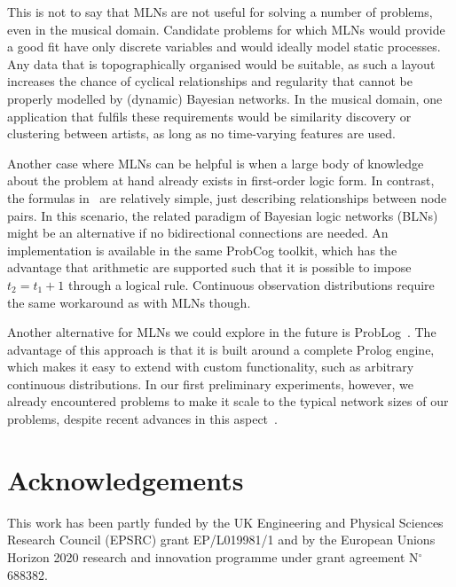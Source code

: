 \documentclass[letterpaper]{article} %
\begin{document}
This is not to say that MLNs are not useful for solving a number of problems, even in the musical domain. Candidate problems for which MLNs would provide a good fit have only discrete variables and would ideally model static processes. Any data that is topographically organised would be suitable, as such a layout increases the chance of cyclical relationships and regularity that cannot be properly modelled by (dynamic) Bayesian networks. In the musical domain, one application that fulfils these requirements would be similarity discovery or clustering between artists, as long as no time-varying features are used.

Another case where MLNs can be helpful is when a large body of knowledge about the problem at hand already exists in first-order logic form. In contrast, the formulas in~\cite{papadopoulos2012ismir,papadopoulos2013icassp,papadopoulos2017taslp} are relatively simple, just describing relationships between node pairs. In this scenario, the related paradigm of Bayesian logic networks (BLNs)~\cite{jain2009tr} might be an alternative if no bidirectional connections are needed. An implementation is available in the same ProbCog toolkit, which has the advantage that arithmetic are supported such that it is possible to impose $t_2=t_1+1$ through a logical rule. Continuous observation distributions require the same workaround as with MLNs though.

Another alternative for MLNs we could explore in the future is ProbLog~\cite{fierens2015tplp}. The advantage of this approach is that it is built around a complete Prolog engine, which makes it easy to extend with custom functionality, such as arbitrary continuous distributions. In our first preliminary experiments, however, we already encountered problems to make it scale to the typical network sizes of our problems, despite recent advances in this aspect~\cite{vlasselaer2016ai}.

\section*{Acknowledgements}
This work has been partly funded by the UK Engineering and Physical Sciences Research Council (EPSRC) grant EP/L019981/1 and by the European Unions Horizon 2020 research and innovation programme under grant agreement N$^\circ$ 688382.
\end{document}
